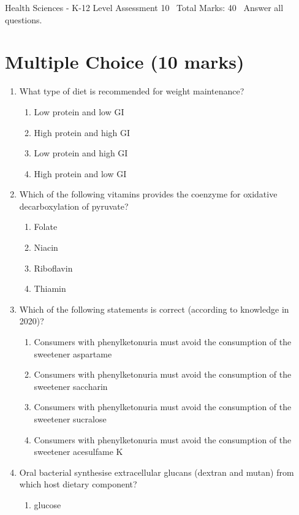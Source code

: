 \documentclass[12pt]{article}
\begin{document}
\begin{center}
Health Sciences - K-12 Level Assessment 10 \
Total Marks: 40 \
Answer all questions.
\end{center}

\section*{Multiple Choice (10 marks)}
\begin{enumerate}[label=\arabic*.]
\item What type of diet is recommended for weight maintenance?
\begin{enumerate}[label=(\alph*)]
    \item Low protein and low GI
    \item High protein and high GI
    \item Low protein and high GI
    \item High protein and low GI
\end{enumerate}
\item Which of the following vitamins provides the coenzyme for oxidative decarboxylation of pyruvate?
\begin{enumerate}[label=(\alph*)]
    \item Folate
    \item Niacin
    \item Riboflavin
    \item Thiamin
\end{enumerate}
\item Which of the following statements is correct (according to knowledge in 2020)?
\begin{enumerate}[label=(\alph*)]
    \item Consumers with phenylketonuria must avoid the consumption of the sweetener aspartame
    \item Consumers with phenylketonuria must avoid the consumption of the sweetener saccharin
    \item Consumers with phenylketonuria must avoid the consumption of the sweetener sucralose
    \item Consumers with phenylketonuria must avoid the consumption of the sweetener acesulfame K
\end{enumerate}
\item Oral bacterial synthesise extracellular glucans (dextran and mutan) from which host dietary component?
\begin{enumerate}[label=(\alph*)]
    \item glucose

\end{enumerate}
\end{enumerate}
\end{document}
